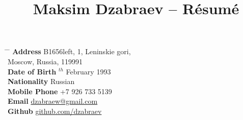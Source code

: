 \documentclass[10pt]{article} %
\begin{document}

\title{Maksim Dzabraev -- Résumé} %


\parbox{0.5\textwidth}{ %
\begin{tabbing} %
\hspace{3cm} \= \hspace{4cm} \= \kill %
{\bf Address} \> B1656left, 1, Leninskie gori,\\ %
\> Moscow, Russia, 119991 \\ %
{\bf Date of Birth} $^{th}$ February 1993 \\ %
{\bf Nationality} \> Russian \\ %
{\bf Mobile Phone} \> +7 926 733 5139 \\ %
{\bf Email} \> \href{mailto:dzabraew@gmail.com}{dzabraew@gmail.com} \\ %
{\bf Github} \> \href{https://github.com/dzabraev}{github.com/dzabraev} \\ %
\end{tabbing}}
\hfill %
\end{document}
